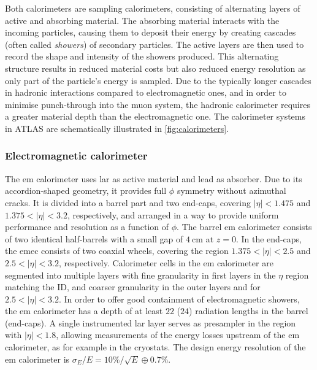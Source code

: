 Both calorimeters are sampling calorimeters, consisting of alternating layers of active and absorbing material. The absorbing material interacts with the incoming particles, causing them to deposit their energy by creating cascades (often called \textit{showers}) of secondary particles. The active layers are then used to record the shape and intensity of the showers produced. This alternating structure results in reduced material costs but also reduced energy resolution as only part of the particle's energy is sampled. Due to the typically longer cascades in hadronic interactions compared to electromagnetic ones, and in order to minimise punch-through into the muon system, the hadronic calorimeter requires a greater material depth than the electromagnetic one. The calorimeter systems in ATLAS are schematically illustrated in \cref{fig:calorimeters}.

\subsubsection{Electromagnetic calorimeter}

The \gls{em} calorimeter uses \gls{lar} as active material and lead as absorber. Due to its accordion-shaped geometry, it provides full $\phi$ symmetry without azimuthal cracks. It is divided into a barrel part and two end-caps, covering $\vert\eta\vert <1.475$ and $1.375 < \vert\eta\vert <3.2$, respectively, and arranged in a way to provide uniform performance and resolution as a function of $\phi$. The barrel \gls{em} calorimeter consists of two identical half-barrels with a small gap of $\SI{4}{\centi\meter}$ at $z=0$. In the end-caps, the \gls{emec} consists of two coaxial wheels, covering the region $1.375 < \vert\eta\vert <2.5$ and $2.5 < \vert\eta\vert <3.2$, respectively. Calorimeter cells in the \gls{em} calorimeter are segmented into multiple layers with fine granularity in first layers in the $\eta$ region matching the ID, and coarser granularity in the outer layers and for $2.5 < \vert\eta\vert <3.2$. In order to offer good containment of electromagnetic showers, the \gls{em} calorimeter has a depth of at least $22$ ($24$) radiation lengths in the barrel (end-caps). A single instrumented \gls{lar} layer serves as presampler in the region with $\vert\eta\vert <1.8$, allowing measurements of the energy losses upstream of the \gls{em} calorimeter, as for example in the cryostats. The design energy resolution of the \gls{em} calorimeter is $\sigma_E / E = 10\% / \sqrt{E} \oplus 0.7\%$.

